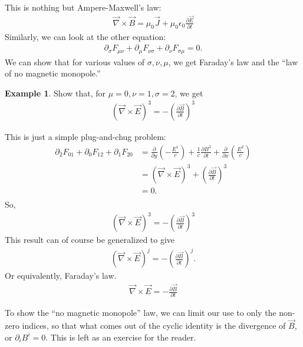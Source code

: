 \documentclass{book}
\theoremstyle{definition}
\newtheorem{exmp}{Example}[section]
\begin{document}
This is nothing but Ampere-Maxwell's law:
\begin{align*}
\boxed{\vec{\nabla}\times\vec{B} =  \mu_0 \vec{J} + \mu_0 \epsilon_0 \frac{\partial \vec{E}}{\partial t}}
\end{align*}
Similarly, we can look at the other equation:
\begin{align*}
\partial_\sigma F_{\mu\nu} + \partial_\mu F_{\nu\sigma} + \partial_\nu F_{\sigma\mu} = 0.
\end{align*}
We can show that for various values of $\sigma, \nu, \mu$, we get Faraday's law and the ``law of no magnetic monopole.''
\begin{exmp}
	Show that, for $\mu = 0, \nu = 1, \sigma = 2$, we get
	\begin{align*}
	\left( \vec{\nabla} \times \vec{E}\right) ^3  = -\left( 
	\frac{\partial \vec{B}}{\partial t} \right)^3
	\end{align*} 
	
	This is just a simple plug-and-chug problem:
	\begin{align*}
	\partial_2 F_{01} + \partial_0 F_{12} + \partial_1 F_{20}
	&= \frac{\partial}{\partial y}\left( -\frac{E^1}{c} \right) + \frac{1}{c}\frac{\partial B^3}{\partial t} + \frac{\partial }{\partial x}\left( \frac{E^2}{c} \right)\\
	&= \left( \vec{\nabla}\times\vec{E} \right)^3 + \left( \frac{\partial \vec{B}}{\partial t}\right)^3\\
	&= 0.\\
	\end{align*}
	So,
	\begin{align*}
	\left( \vec{\nabla} \times \vec{E}\right) ^3  = -\left( 
	\frac{\partial \vec{B}}{\partial t} \right)^3
	\end{align*}
	This result can of course be generalized to give
	\begin{align*}
	\left( \vec{\nabla} \times \vec{E}\right) ^j  = -\left( 
	\frac{\partial \vec{B}}{\partial t} \right)^j.
	\end{align*}
	Or equivalently, Faraday's law. 
	\begin{align*}
	\boxed{{\vec{\nabla} \times \vec{E}  = - 
	\frac{\partial \vec{B}}{\partial t}}}
	\end{align*}
\end{exmp}
To show the ``no magnetic monopole'' law, we can limit our use to only the non-zero indices, so that what comes out of the cyclic identity is the divergence of $\vec{B}$, or $\partial_i B^i = 0$. This is left as an exercise for the reader. \\
\end{document}
